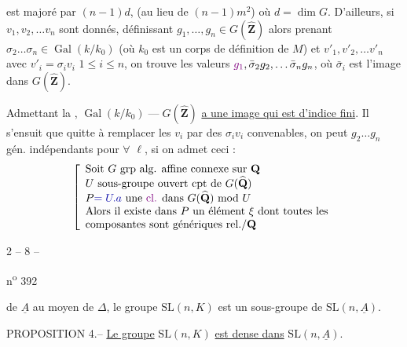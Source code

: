 est majoré par $(n-1)d$, (au lieu de $(n-1)m^2$) où $d=\dim G$.  D'ailleurs, si $v_1,v_2,\ldots v_n$ sont donnés,   définissant $g_1,\ldots,g_n\in G(\widehat{\mathbf Z})$ alors prenant $\sigma_2\ldots\sigma_n\in\operatorname{Gal}(k/k_0)$ (où $k_0$ est un corps de définition  de $M$) et $v'_1,v'_2,\ldots v'_n$ avec $v'_i=\sigma_i v_i$ $1\leq i\leq n$, on trouve les valeurs $\unsure{g_1},\bar\sigma_2g_2,\ldots\bar\sigma_ng_n$, où $\bar\sigma_i$ est l'image dans $G(\widehat{\mathbf Z})$. 

Admettant la , $\operatorname{Gal}(k/k_0)\mathbin{\text{---}}G(\widehat{\mathbf Z})$ \uline{a une image qui est d'indice fini}. Il s'ensuit que quitte à remplacer les $v_i$ par des $\sigma_i v_i$ convenables, on peut   $g_2\ldots g_n$ gén. indépendants pour \uline{$\forall$} $\ell$, si on admet ceci :
\[
\left[\begin{array}{l}
\text{Soit }G\text{ grp alg. affine connexe sur }\mathbf Q\\
U\text{ sous-groupe ouvert cpt de }G(\widehat{\mathbf Q})\\
P\inserted{=U.a}\text{ une \unsure{cl.} dans }G(\widehat{\mathbf Q})\text{ mod }U\\
\text{Alors il existe dans }P\text{ un élément }\xi\text{ dont toutes les}\\
\text{composantes sont génériques rel./}\mathbf Q
\end{array}\right.
\]

\begin{center}2 -- 8 --\end{center}
\begin{flushright}n\textsuperscript{o} 392\end{flushright}

de $\underline A$ au moyen de $\Delta$, le groupe $\mathrm{SL}(n,K)$ est un sous-groupe de $\mathrm{SL}(n,\underline A)$.

PROPOSITION 4.-- \uline{Le groupe} $\mathrm{SL}(n,K)$ \uline{est dense dans} $\mathrm{SL}(n,\underline A)$.

